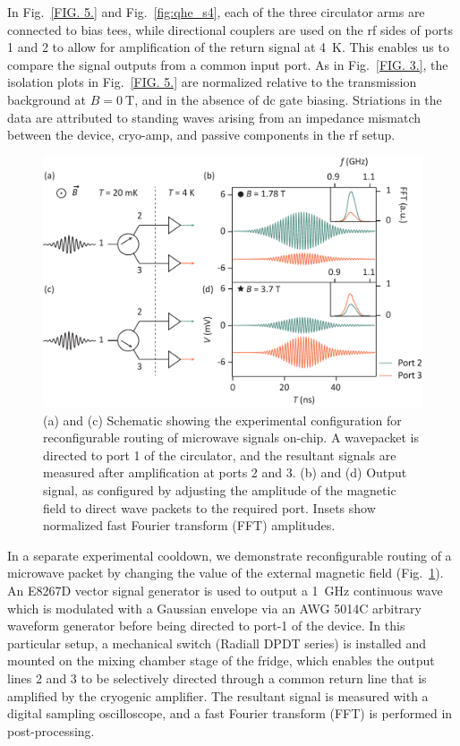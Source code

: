 In Fig.~\ref{FIG. 5.} and Fig.~\ref{fig:qhe_s4}, each of the three circulator arms are connected to bias tees, while directional couplers are used on the rf sides of ports 1 and 2 to allow for amplification of the return signal at \SI{4}{\kelvin}. This enables us to compare the signal outputs from a common input port. As in Fig.~\ref{FIG. 3.}, the isolation plots in Fig.~\ref{FIG. 5.} are normalized relative to the transmission background at $B=\SI{0}{\tesla}$, and in the absence of dc gate biasing. Striations in the data are attributed to standing waves arising from an impedance mismatch between the device, cryo-amp, and passive components in the rf setup.

\begin{figure}
  \includegraphics[scale=0.7]{Sfig3.pdf}
  \caption[Reconfigurable routing]{(a) and (c) Schematic showing the experimental configuration for reconfigurable routing of microwave signals on-chip. A wavepacket is directed to port 1 of the circulator, and the resultant signals are measured after amplification at ports 2 and 3. (b) and (d) Output signal, as configured by adjusting the amplitude of the magnetic field to direct wave packets to the required port. Insets show normalized fast Fourier transform (FFT) amplitudes.}
  \label{fig:qhe_s3}
\end{figure}

In a separate experimental cooldown, we demonstrate reconfigurable routing of a microwave packet by changing the value of the external magnetic field (Fig.~\ref{fig:qhe_s3}). An E8267D vector signal generator is used to output a \SI{1}{\giga\hertz} continuous wave which is modulated with a Gaussian envelope via an AWG 5014C arbitrary waveform generator before being directed to port-1 of the device. In this particular setup, a mechanical switch (Radiall DPDT series) is installed and mounted on the mixing chamber stage of the fridge, which enables the output lines 2 and 3 to be selectively directed through a common return line that is amplified by the cryogenic amplifier. The resultant signal is measured with a digital sampling oscilloscope, and a fast Fourier transform (FFT) is performed in post-processing.

